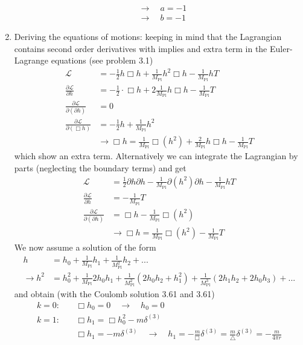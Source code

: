 \documentclass[../main.tex]{subfiles}
\begin{document}
\begin{enumerate}[label=(\alph*)]
\begin{align}
&\rightarrow\quad a=-1\\
&\rightarrow\quad b=-1
\end{align} 
\item Deriving the equations of motions: keeping in mind that the Lagrangian contains second order derivatives with implies and extra term in the Euler-Lagrange equations (see problem 3.1)
\begin{align}
\mathcal{L}&=-\frac{1}{2}h\Box h+\frac{1}{M_\text{Pl}}h^2\Box h-\frac{1}{M_\text{Pl}}hT\\
\frac{\partial\mathcal{L}}{\partial h}&=-\frac{1}{2}\cdot\Box h+2\frac{1}{M_\text{Pl}}h\Box h-\frac{1}{M_\text{Pl}}T\\
\frac{\partial\mathcal{L}}{\partial(\partial h)}&=0\\
\frac{\partial\mathcal{L}}{\partial(\Box h)}&=-\frac{1}{2}h+\frac{1}{M_\text{Pl}}h^2\\
&\rightarrow\Box h=\frac{1}{M_\text{Pl}}\Box(h^2)+\frac{2}{M_\text{Pl}}h\Box h-\frac{1}{M_\text{Pl}}T
\end{align}
which show an extra term. Alternatively we can integrate the Lagrangian by parts (neglecting the boundary terms) and get
\begin{align}
\mathcal{L}&=\frac{1}{2}\partial h\partial h-\frac{1}{M_\text{Pl}}\partial(h^2)\partial h-\frac{1}{M_\text{Pl}}hT\\
\frac{\partial\mathcal{L}}{\partial h}&=-\frac{1}{M_\text{Pl}}T\\
\frac{\partial\mathcal{L}}{\partial(\partial h)}&=\Box h-\frac{1}{M_\text{Pl}}\Box(h^2)\\
&\rightarrow\Box h=\frac{1}{M_\text{Pl}}\Box(h^2)-\frac{1}{M_\text{Pl}}T
\end{align}
We now assume a solution of the form
\begin{align}
h&=h_0+\frac{1}{M_\text{Pl}}h_1+\frac{1}{M_\text{Pl}^2}h_2+...\\
\rightarrow h^2&=h_0^2+\frac{1}{M_\text{Pl}}2h_0h_1+\frac{1}{M_\text{Pl}^2}(2h_0h_2+h_1^2)+\frac{1}{M_\text{Pl}^3}(2h_1h_2+2h_0h_3)+...
\end{align}
and obtain (with the Coulomb solution 3.61 and 3.61)
\begin{align}
k=0:&\quad\Box h_0=0\quad\rightarrow\quad h_0=0\\
k=1:&\quad\Box h_1=\Box h_0^2-m\delta^{(3)}\\
    &\quad\Box h_1=-m\delta^{(3)}\quad\rightarrow\quad h_1=-\frac{m}{\Box}\delta^{(3)}=\frac{m}{\triangle}\delta^{(3)}=-\frac{m}{4\pi r}\\

\end{align}
\end{enumerate}
\end{document}
